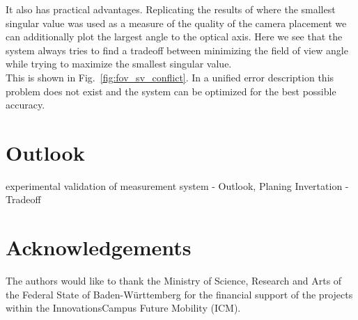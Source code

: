 \documentclass[5p,times,procedia]{elsarticle}
\begin{document}
It also has practical advantages.
Replicating the results of \cite{camera_placement} where the smallest singular value was used as a measure of the quality of the camera placement we can additionally plot the largest angle to the optical axis.
Here we see that the system always tries to find a tradeoff between minimizing the field of view angle while trying to maximize the smallest singular value.\\
This is shown in Fig.~\ref{fig:fov_sv_conflict}.
In a unified error description this problem does not exist and the system can be optimized for the best possible accuracy.



\section{Outlook}
experimental validation of measurement system
- Outlook, Planing Invertation
- Tradeoff



%

\section*{Acknowledgements}
The authors would like to thank the Ministry of Science, Research and Arts of the Federal State of Baden-Württemberg for the financial support of the projects within the InnovationsCampus Future Mobility (ICM).



\end{document}

